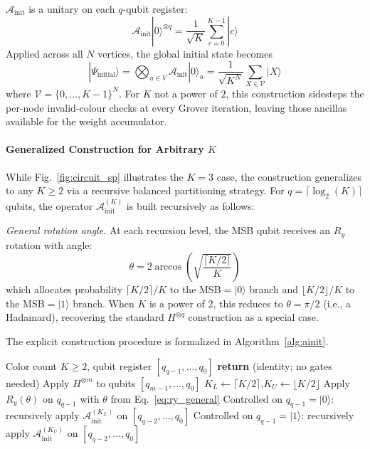 \documentclass{ieeeaccess}
\begin{document}
$\mathcal{A}_{\text{init}}$ is a unitary on each $q$-qubit register:
\begin{equation}
\mathcal{A}_{\text{init}} |0\rangle^{\otimes q} = \frac{1}{\sqrt{K}} \sum_{c=0}^{K-1} |c\rangle
\end{equation}
Applied across all $N$ vertices, the global initial state becomes
\begin{equation}
|\Psi_{\text{initial}}\rangle = \bigotimes_{u \in V} \mathcal{A}_{\text{init}} |0\rangle_u = \frac{1}{\sqrt{K^N}} \sum_{X \in \mathcal{V}} |X\rangle \label{eq:initial}
\end{equation}
where $\mathcal{V} = \{0, \dots, K-1\}^N$. For $K$ not a power of $2$, this construction sidesteps the per-node invalid-colour checks at every Grover iteration, leaving those ancillas available for the weight accumulator.

\paragraph{Generalized Construction for Arbitrary $K$}
While Fig.~\ref{fig:circuit_sp} illustrates the $K=3$ case, the construction generalizes to any $K \ge 2$ via a recursive balanced partitioning strategy. For $q = \lceil \log_2(K) \rceil$ qubits, the operator $\mathcal{A}_{\mathrm{init}}^{(K)}$ is built recursively as follows:

\textit{General rotation angle.} At each recursion level, the MSB qubit receives an $R_y$ rotation with angle:
\begin{equation}
\theta = 2\arccos\!\left(\sqrt{\frac{\lceil K/2 \rceil}{K}}\right)
\label{eq:ry_general}
\end{equation}
which allocates probability $\lceil K/2 \rceil / K$ to the MSB$=|0\rangle$ branch and $\lfloor K/2 \rfloor / K$ to the MSB$=|1\rangle$ branch. When $K$ is a power of 2, this reduces to $\theta = \pi/2$ (i.e., a Hadamard), recovering the standard $H^{\otimes q}$ construction as a special case.

The explicit construction procedure is formalized in Algorithm~\ref{alg:ainit}.

\begin{algorithm}[h!]
\caption{Generalized $\mathcal{A}_{\mathrm{init}}^{(K)}$ Construction}\label{alg:ainit}
\begin{algorithmic}[1]
\REQUIRE Color count $K \ge 2$, qubit register $[q_{q-1}, \dots, q_0]$
    \STATE \textbf{return} (identity; no gates needed)
    \STATE Apply $H^{\otimes m}$ to qubits $[q_{m-1}, \dots, q_0]$
\ELSE
    \STATE $K_L \leftarrow \lceil K/2 \rceil$,\quad $K_U \leftarrow \lfloor K/2 \rfloor$
    \STATE Apply $R_y(\theta)$ on $q_{q-1}$ with $\theta$ from Eq.~\eqref{eq:ry_general}
    \STATE Controlled on $q_{q-1} = |0\rangle$: recursively apply $\mathcal{A}_{\mathrm{init}}^{(K_L)}$ on $[q_{q-2}, \dots, q_0]$
    \STATE Controlled on $q_{q-1} = |1\rangle$: recursively apply $\mathcal{A}_{\mathrm{init}}^{(K_U)}$ on $[q_{q-2}, \dots, q_0]$
\ENDIF
\end{algorithmic}
\end{algorithm}
\end{document}
